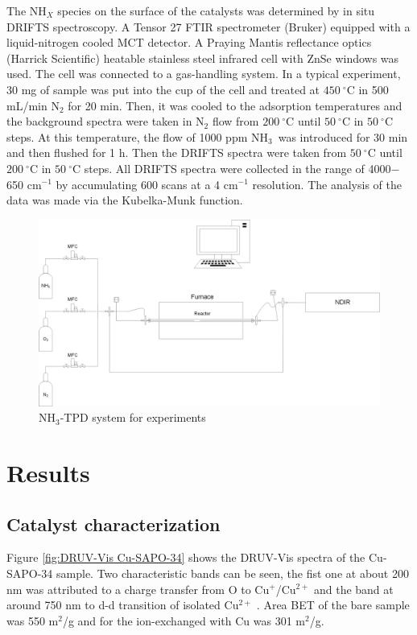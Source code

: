 \documentclass[preprint,12pt]{elsarticle}
\newcommand{\ammonia}{NH$_3$}
\newcommand{\degreeC}[1]{$#1\  ^{\circ}\mathrm{C}$}
\begin{document}
The NH$_X$ species on the surface of the catalysts was determined by in situ DRIFTS spectroscopy. A Tensor 27 FTIR spectrometer (Bruker) equipped with a liquid-nitrogen cooled MCT detector. A Praying Mantis reflectance optics (Harrick Scientific) heatable stainless steel infrared cell with ZnSe windows was used. The cell was connected to a gas-handling system. In a typical experiment, 30 mg of sample was put into the cup of the cell and treated at \degreeC{450} in 500 mL/min N$_2$ for 20 min. Then, it was cooled to the adsorption temperatures and the background spectra were taken in N$_2$ flow from \degreeC{200} until \degreeC{50} in \degreeC{50} steps. At this temperature, the flow of 1000 ppm \ammonia\ was introduced for 30 min and then flushed for 1 h. Then the DRIFTS spectra were taken from \degreeC{50} until \degreeC{200} in \degreeC{50} steps. All DRIFTS spectra were collected in the range of 4000$-$650 cm$^{-1}$ by accumulating 600 scans at a 4 cm$^{-1}$ resolution. The analysis of the data was made via the Kubelka-Munk function.


\begin{figure}
\centering
\centering\includegraphics[width=0.95\linewidth]{Figures/NH3TPD_fig.png}
\caption{\ammonia-TPD system for experiments}
\label{fig:NH3-TPD system}
\end{figure}


\section{Results}
\label{S:2}

\subsection{Catalyst characterization}

Figure \ref{fig:DRUV-Vis Cu-SAPO-34} shows the DRUV-Vis spectra of the Cu-SAPO-34 sample. Two characteristic bands can be seen, the fist one at about 200 nm was attributed to a charge transfer from O to Cu$^{+}$/Cu$^{2+}$ and the band at around 750 nm to d-d transition of isolated Cu$^{2+}$ \cite{Leistner2017ImpactCu/SAPO-34}. Area BET of the bare sample was 550 m$^2$/g and for the ion-exchanged with Cu was 301 m$^2$/g.
\end{document}
